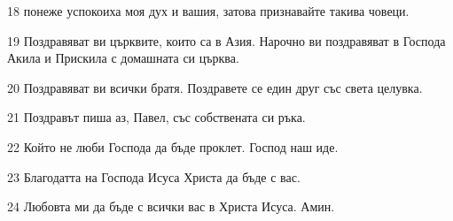\par 18 понеже успокоиха моя дух и вашия, затова признавайте такива човеци.
\par 19 Поздравяват ви църквите, които са в Азия. Нарочно ви поздравяват в Господа Акила и Прискила с домашната си църква.
\par 20 Поздравяват ви всички братя. Поздравете се един друг със света целувка.
\par 21 Поздравът пиша аз, Павел, със собствената си ръка.
\par 22 Който не люби Господа да бъде проклет. Господ наш иде.
\par 23 Благодатта на Господа Исуса Христа да бъде с вас.
\par 24 Любовта ми да бъде с всички вас в Христа Исуса. Амин.

